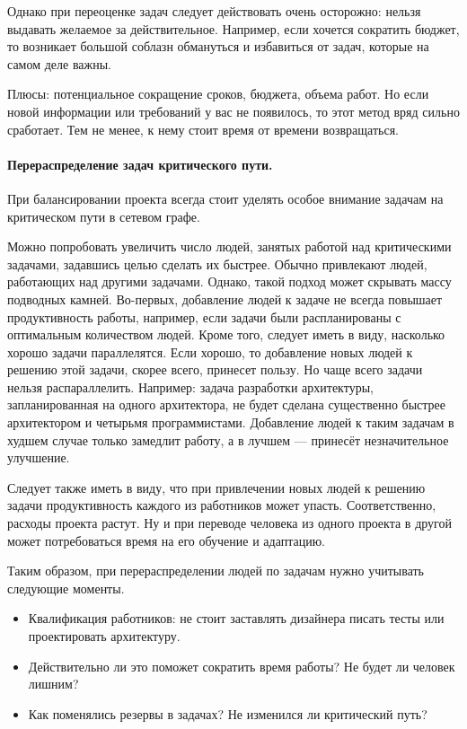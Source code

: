 \documentclass{../../text-style}
\begin{document}
Однако при переоценке задач следует действовать очень осторожно: нельзя выдавать желаемое за действительное. Например, если хочется сократить бюджет, то возникает большой соблазн обмануться и избавиться от задач, которые на самом деле важны.

Плюсы: потенциальное сокращение сроков, бюджета, объема работ. Но если новой информации или требований у вас не появилось, то этот метод вряд сильно сработает. Тем не менее, к нему стоит время от времени возвращаться.

\paragraph{Перераспределение задач критического пути.} При балансировании проекта всегда стоит уделять особое внимание задачам на критическом пути в сетевом графе.

Можно попробовать увеличить число людей, занятых работой над критическими задачами, задавшись целью сделать их быстрее. Обычно привлекают людей, работающих над другими задачами. Однако, такой подход может скрывать массу подводных камней. Во-первых, добавление людей к задаче не всегда повышает продуктивность работы, например, если задачи были распланированы с оптимальным количеством людей. Кроме того, следует иметь в виду, насколько хорошо задачи параллелятся. Если хорошо, то добавление новых людей к решению этой задачи, скорее всего, принесет пользу. Но чаще всего задачи нельзя распараллелить. Например: задача разработки архитектуры, запланированная на одного архитектора, не будет сделана существенно быстрее архитектором и четырьмя программистами. Добавление людей к таким задачам в худшем случае только замедлит работу, а в лучшем --- принесёт незначительное улучшение.

Следует также иметь в виду, что при привлечении новых людей к решению задачи продуктивность каждого из работников может упасть. Соответственно, расходы проекта растут. Ну и при переводе человека из одного проекта в другой может потребоваться время на его обучение и адаптацию.

Таким образом, при перераспределении людей по задачам нужно учитывать следующие моменты.

\begin{itemize}
    \item Квалификация работников: не стоит заставлять дизайнера писать тесты или проектировать архитектуру.
    \item Действительно ли это поможет сократить время работы? Не будет ли человек лишним? 
    \item Как поменялись резервы в задачах? Не изменился ли критический путь?
\end{itemize}
\end{document}

